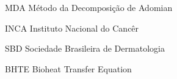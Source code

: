 \begin{siglas}
	\item MDA       Método da Decomposição de Adomian 
    \item INCA 		Instituto Nacional do Cancêr
    \item SBD 	    Sociedade Brasileira de Dermatologia
     \item BHTE     Bioheat Transfer Equation 
\end{siglas}
